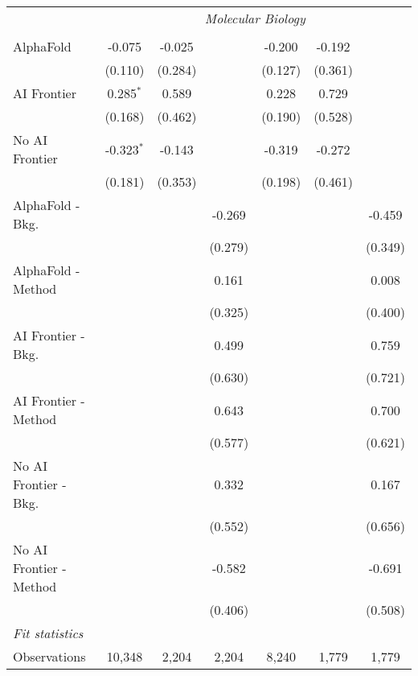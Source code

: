 \begin{tabular}{lcccccc}
 & \multicolumn{6}{c}{\textit{Molecular Biology}} \\ \\
   AlphaFold               & -0.075       & -0.025  &         & -0.200  & -0.192  &   \\   
                           & (0.110)      & (0.284) &         & (0.127) & (0.361) &   \\   
   AI Frontier             & 0.285$^{*}$  & 0.589   &         & 0.228   & 0.729   &   \\   
                           & (0.168)      & (0.462) &         & (0.190) & (0.528) &   \\   
   No AI Frontier          & -0.323$^{*}$ & -0.143  &         & -0.319  & -0.272  &   \\   
                           & (0.181)      & (0.353) &         & (0.198) & (0.461) &   \\   
   AlphaFold - Bkg.        &              &         & -0.269  &         &         & -0.459\\   
                           &              &         & (0.279) &         &         & (0.349)\\   
   AlphaFold - Method      &              &         & 0.161   &         &         & 0.008\\   
                           &              &         & (0.325) &         &         & (0.400)\\   
   AI Frontier - Bkg.      &              &         & 0.499   &         &         & 0.759\\   
                           &              &         & (0.630) &         &         & (0.721)\\   
   AI Frontier - Method    &              &         & 0.643   &         &         & 0.700\\   
                           &              &         & (0.577) &         &         & (0.621)\\   
   No AI Frontier - Bkg.   &              &         & 0.332   &         &         & 0.167\\   
                           &              &         & (0.552) &         &         & (0.656)\\   
   No AI Frontier - Method &              &         & -0.582  &         &         & -0.691\\   
                           &              &         & (0.406) &         &         & (0.508)\\   
   \midrule
   \emph{Fit statistics}\\
   Observations            & 10,348       & 2,204   & 2,204   & 8,240   & 1,779   & 1,779\\  
   

\end{tabular}
